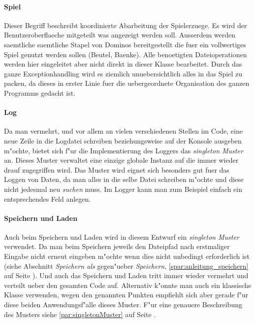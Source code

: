 \paragraph{Spiel}
Dieser Begriff beschreibt koordinierte Abarbeitung der Spielerzuege. Es wird der Benutzeroberflaeche mitgeteilt was angezeigt werden soll. Ausserdem werden saemtliche saemtliche Stapel von Dominos bereitgestellt die fuer ein vollwertiges Spiel genutzt werden sollen (Beutel, Baenke). Alle benoetigten Dateioperationen werden hier eingeleitet aber nicht direkt in dieser Klasse bearbeitet. Durch das ganze Exceptionhandling wird es ziemlich unuebersichtlich alles in das Spiel zu packen, da dieses in erster Linie fuer die uebergeordnete Organisation des ganzen Programms gedacht ist. 

\paragraph{Log}
Da man vermehrt, und vor allem an vielen verschiedenen Stellen im Code, eine neue Zeile in die Logdatei schreiben beziehungsweise auf der Konsole ausgeben m"ochte, bietet sich f"ur die Implementierung des Loggers das \emph{singleton Muster} an. Dieses Muster verwaltet eine einzige globale Instanz auf die immer wieder drauf zugegriffen wird. Das Muster wird eignet sich besonders gut fuer das Loggen von Daten, da man alles in die selbe Datei schreiben m"ochte und diese nicht jedesmal neu \emph{suchen} muss. Im Logger kann man zum Beispiel einfach ein entsprechendes Feld anlegen. 

\paragraph{Speichern und Laden}
Auch beim Speichern und Laden wird in diesem Entwurf ein \emph{singleton Muster} verwendet. Da man beim Speichern jeweils den Dateipfad nach erstmaliger Eingabe nicht erneut eingeben m"ochte wenn dies nicht unbedingt erforderlich ist (siehe Abschnitt 
\emph{Speichern als} gegen"ueber \emph{Speichern}, \ref{spar:anleitung_speichern} auf Seite \pageref{spar:anleitung_speichern}). Und auch das Speichern und Laden tritt immer wieder vermehrt und verteilt ueber den gesamten Code auf. Alternativ k"onnte man auch ein klassische Klasse verwenden, wegen den genannten Punkten empfiehlt sich aber gerade f"ur diese beiden Anwendungsf"alle dieses Muster. F"ur eine genauere Beschreibung des Musters siehe \ref{par:singletonMuster}  auf Seite \pageref{par:singletonMuster}. 
